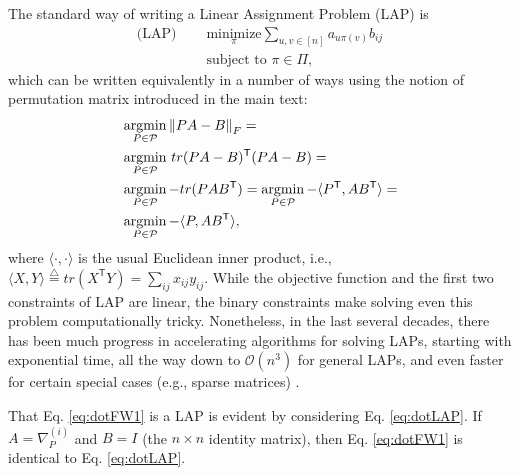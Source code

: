 \documentclass[11pt]{article}
\newcommand{\defn}{\overset{\triangle}{=}}
\providecommand{\norm}[1]{\left \lVert#1 \right  \rVert}
\newcommand{\argmin}{\operatornamewithlimits{argmin}}
\newcommand{\T}{^{\ensuremath{\mathsf{T}}}}           %
\providecommand{\mc}[1]{\mathcal{#1}}
\newcommand{\PmcP}{P \in \mc{P}}
\begin{document}
The standard way of writing a Linear Assignment Problem (LAP) is
\begin{subequations} \label{eq:LAP}
\begin{align}
	 \text{(LAP) }\quad  &\underset{\pi}{\text{minimize}} \sum_{u,v \in [n]} a_{u \pi(v)} b_{ij} \\
	&\text{subject to } \pi \in \Pi,
\end{align}
\end{subequations}
which can be written equivalently in a number of ways using the notion of permutation matrix introduced in the main text:
\begin{subequations} \label{eq:LAP2}
\begin{align}
	&\argmin_{\PmcP} \norm{PA - B}_F =\\
	&\argmin_{\PmcP} \, tr(PA-B)\T (PA-B)=\\ 
	&\argmin_{\PmcP}  -tr (P AB\T) = \argmin_{\PmcP}  -\langle P\T, AB\T \rangle = \label{eq:2c} \\
	&\argmin_{\PmcP}  -\langle P, AB\T \rangle, \label{eq:dotLAP}
\end{align}
\end{subequations}
where $\langle \cdot,\cdot \rangle$ %
is the usual Euclidean inner product, i.e., $\langle X,Y\rangle \defn tr(X\T Y)= \sum_{ij} x_{ij} y_{ij}$.
While the objective function and the first two constraints of LAP are linear, the binary constraints make solving even this problem computationally tricky.  Nonetheless, in the last several decades, there has been much progress in accelerating algorithms for solving LAPs, starting with exponential time, all the way down to $\mc{O}(n^3)$ for general LAPs, and even faster for certain special cases (e.g., sparse matrices) \cite{Jonker1987, Burkard2009}.

That Eq. \eqref{eq:dotFW1} is a LAP is evident by considering Eq. \eqref{eq:dotLAP}.  If $A=\nabla_P^{(i)}$ and $B=I$ (the $n\times n$ identity matrix), then Eq. \eqref{eq:dotFW1} is identical to Eq. \eqref{eq:dotLAP}.
\end{document}
